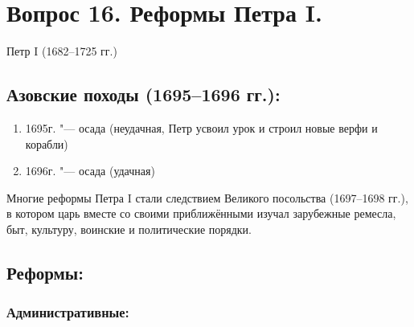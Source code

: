 \section{Вопрос 16. Реформы Петра I.}

Петр I (1682--1725 гг.)

\subsection{Азовские походы (1695--1696 гг.):}

\begin{enumerate}
    \item{ 1695г. "--- осада (неудачная, Петр усвоил урок и строил новые верфи и корабли) }
    \item{ 1696г. "--- осада (удачная) }
\end{enumerate}

Многие реформы Петра I стали следствием Великого посольства (1697--1698 гг.), в котором царь вместе со своими приближёнными изучал зарубежные ремесла, быт, культуру, воинские и политические порядки.

\subsection{Реформы:}

\subsubsection{Административные:}

